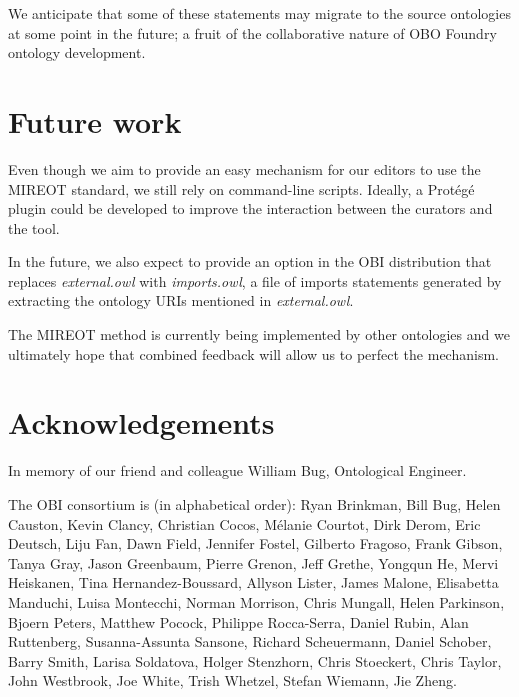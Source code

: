 \documentclass{elsart3p}    %
\newcommand{\protege}{Prot\'{e}g\'{e}}
\begin{document}
We anticipate that some of these statements may migrate to the source ontologies at some point in the future; a fruit of the collaborative nature of OBO Foundry ontology development. 

\section*{Future work}
Even though we aim to provide an easy mechanism for our editors to use the MIREOT standard, we still rely on command-line scripts.
Ideally, a \protege\ \cite{RefWorks:1501} plugin could be developed to improve the interaction between the curators and the tool.

In the future, we also expect to provide an option in the OBI distribution that replaces \emph{external.owl} with \emph{imports.owl}, a file of imports statements generated by extracting the ontology URIs mentioned in \emph{external.owl}.

The MIREOT method is currently being implemented by other ontologies and we ultimately hope that combined feedback will allow us to perfect the mechanism.


\section*{Acknowledgements}

In memory of our friend and colleague William Bug, Ontological Engineer. 

The OBI consortium is (in alphabetical order): Ryan Brinkman, Bill Bug, Helen Causton, Kevin Clancy, Christian Cocos, M\'elanie Courtot, Dirk Derom, Eric Deutsch, Liju Fan, Dawn Field, Jennifer Fostel, Gilberto Fragoso, Frank Gibson, Tanya Gray, Jason Greenbaum, Pierre Grenon, Jeff Grethe, Yongqun He, Mervi Heiskanen, Tina Hernandez-Boussard, Allyson Lister, James Malone, Elisabetta Manduchi, Luisa Montecchi, Norman Morrison, Chris Mungall, Helen Parkinson, Bjoern Peters, Matthew Pocock, Philippe Rocca-Serra, Daniel Rubin, Alan Ruttenberg, Susanna-Assunta Sansone, Richard Scheuermann, Daniel Schober, Barry Smith, Larisa Soldatova, Holger Stenzhorn, Chris Stoeckert, Chris Taylor, John Westbrook,  Joe White, Trish Whetzel, Stefan Wiemann, Jie Zheng. 

   


\end{document}
